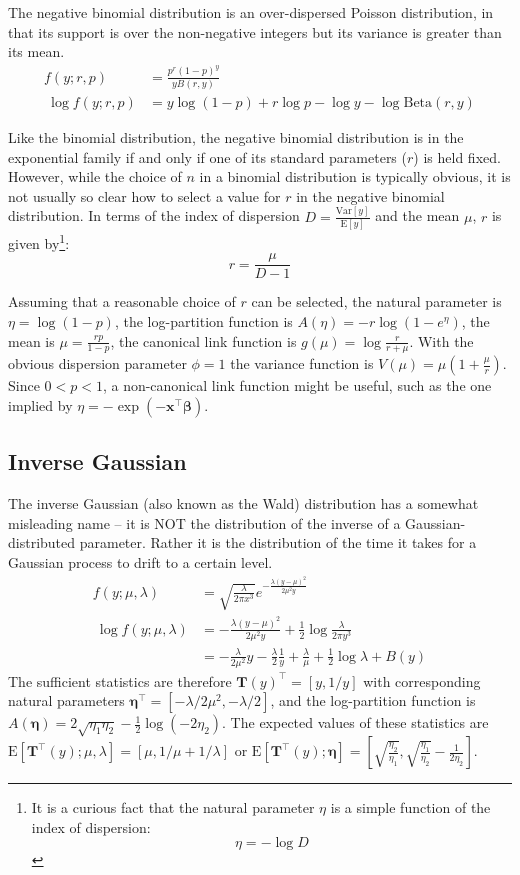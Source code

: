 \documentclass{article}
\newcommand{\bbeta}{\boldsymbol{\beta}}
\begin{document}
The negative binomial distribution is an over-dispersed Poisson distribution, in
that its support is over the non-negative integers but its variance is greater
than its mean.
\begin{align}
f(y; r, p) &= \frac{p^r (1-p)^y}{ y B(r, y)} \\\
\log f(y; r, p) &= y \log(1-p) + r \log p - \log y - \log \textrm{Beta}(r, y)
\end{align}

Like the binomial distribution, the negative binomial distribution is in the
exponential family if and only if one of its standard parameters (\(r\)) is
held fixed. However, while the choice of \(n\) in a binomial distribution is
typically obvious, it is not usually so clear how to select a value for \(r\)
in the negative binomial distribution.
In terms of the index of dispersion \(D =
\frac{\textrm{Var}[y]}{\textrm{E}[y]}\) and the mean \(\mu\), \(r\) is given
by\footnote{
  It is a curious fact that the natural parameter \(\eta\) is a simple
  function of the index of dispersion: \[ \eta = -\log D \]
}:
\[ r = \frac{\mu}{D-1} \]

Assuming that a reasonable choice of \(r\) can be selected, the natural
parameter is \(\eta = \log(1-p)\), the log-partition function is \(A(\eta)
= - r \log(1 - e^\eta)\), the mean is \(\mu = \frac{rp}{1-p}\), the canonical
link function is \(g(\mu) = \log \frac{r}{r+\mu}\).
With the obvious dispersion parameter \(\phi = 1\) the variance function is
\(V(\mu) = \mu \left( 1 + \frac{\mu}{r} \right)\).
Since \(0 < p < 1\), a non-canonical link function might be useful, such as
the one implied by
\(\eta = - \exp(-\mathbf{x}^\intercal \bbeta)\).


\subsection{Inverse Gaussian}

The inverse Gaussian (also known as the Wald) distribution has a somewhat
misleading name -- it is NOT the distribution of the inverse of a
Gaussian-distributed parameter.
Rather it is the distribution of the time it takes for a Gaussian process to
drift to a certain level.
\begin{align}
f(y; \mu, \lambda) &= \sqrt{\frac{\lambda}{2\pi x^3}}
e^{-\frac{\lambda(y-\mu)^2}{2\mu^2 y}} \\\
\log f(y; \mu, \lambda) &= -\frac{\lambda(y - \mu)^2}{2\mu^2 y} + \frac{1}{2}
\log \frac{\lambda}{2\pi y^3} \\\
&= -\frac{\lambda}{2\mu^2} y - \frac{\lambda}{2} \frac{1}{y} +
\frac{\lambda}{\mu} + \frac{1}{2}\log \lambda + B(y)
\end{align}
The sufficient statistics are therefore \(\mathbf{T}(y)^\intercal = [y, 1/y]\)
with corresponding natural parameters \(\boldsymbol{\eta}^\intercal =
[-\lambda/2\mu^2, -\lambda/2]\), and the log-partition function is
\(A(\boldsymbol{\eta}) = 2\sqrt{\eta_1 \eta_2} - \frac{1}{2} \log (-2\eta_2) \).
The expected values of these statistics are \(\textrm{E}[\mathbf{T}^\intercal(y); \mu,
\lambda] = [\mu, 1/\mu + 1/\lambda] \) or \(\textrm{E}[\mathbf{T}^\intercal
(y); \boldsymbol{\eta}] = \left[\sqrt{\frac{\eta_2}{\eta_1}},
\sqrt{\frac{\eta_1}{\eta_2}} - \frac{1}{2\eta_2}\right]\).
\end{document}
